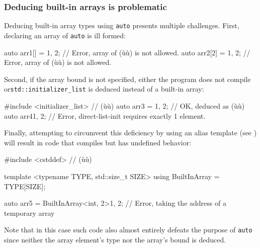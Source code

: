 \subsubsection[Deducing built-in arrays is problematic]{Deducing built-in arrays is problematic}\label{deducing-built-in-arrays-is-problematic}

Deducing built-in array types using \lstinline!auto! presents multiple
challenges. First, declaring an array of \lstinline!auto! is ill formed:

\begin{emcppslisting}
auto arr1[]  = {1, 2};  // Error, array of (ù{}ù) is not allowed.
auto arr2[2] = {1, 2};  // Error, array of (ù{}ù) is not allowed.
\end{emcppslisting}

\noindent Second, if the array bound is not specified, either the program does not
compile or\linebreak[4]%
 \lstinline!std::initializer_list! is deduced instead of a
built-in array:

\begin{emcppslisting}
#include <initializer_list>  // (ù{}ù)
auto arr3 = {1, 2};  // OK, deduced as (ù{}ù)
auto arr4{1, 2};     // Error, direct-list-init requires exactly 1 element.
\end{emcppslisting}

\noindent Finally, attempting to circumvent this deficiency by using an alias
template (see ) will result in code that
compiles but has undefined behavior:

\begin{emcppshiddenlisting}[emcppsbatch=e21]
#include <cstddef>  // (ù{}ù)
\end{emcppshiddenlisting}
\begin{emcppslisting}[emcppsbatch=e21]
template <typename TYPE, std::size_t SIZE>
using BuiltInArray = TYPE[SIZE];

auto arr5 = BuiltInArray<int, 2>{1, 2};
    // Error, taking the address of a temporary array
\end{emcppslisting}

\noindent Note that in this case such code also almost entirely defeats the
purpose of \lstinline!auto! since neither the array element's type nor the
array's bound is deduced.

